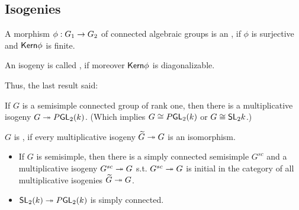 \subsection{Isogenies}
\begin{definition}
	A morphism $\phi : G_1 \overset{}{\rightarrow} G_2$ of connected algebraic groups is an , if $\phi$ is surjective and $\textsf{Kern} \phi$ is finite.
	
	An isogeny is called , if moreover $\textsf{Kern} \phi$ is diagonalizable.
\end{definition}
Thus, the last result said:

If $G$ is a semisimple connected group of rank one, then there is a multiplicative isogeny $G \overset{}{\twoheadrightarrow} P\textsf{GL}_2(k)$. (Which implies $G\overset{}{\cong} P \textsf{GL}_2(k)$ or $G \overset{}{\cong} \textsf{SL}_2 k$.)

\begin{definition}
	$G$ is , if every multiplicative isogeny $\widetilde{G} \overset{}{\twoheadrightarrow} G$ is an isomorphism.
\end{definition}
\begin{remark}[Facts]
	\begin{itemize}
		\item If $G$ is semisimple, then there is a simply connected semisimple $G^{sc}$ and a multiplicative isogeny $G^{sc} \overset{}{\twoheadrightarrow} G$ s.t. $G^{sc} \overset{}{\twoheadrightarrow} G$ is initial in the category of all multiplicative isogenies $\widetilde{G} \overset{}{\twoheadrightarrow} G$.
		\item $\textsf{SL}_2(k) \overset{}{\twoheadrightarrow} P \textsf{GL}_2(k)$ is simply connected.
	\end{itemize}
\end{remark}